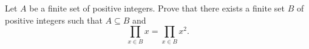 Let $A$ be a finite set of positive integers. Prove that there exists a finite set $B$ of positive integers such that $A\subseteq B$ and \[\displaystyle\prod_{x\in B}x=\displaystyle\prod_{x\in B}x^2.\]